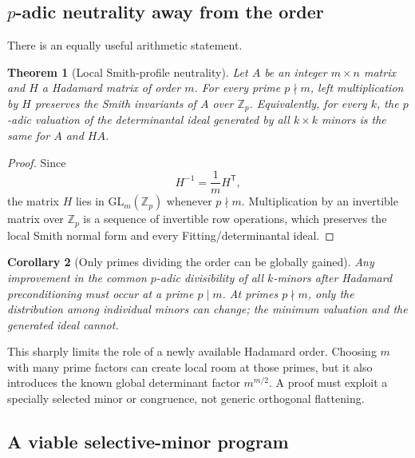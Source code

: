 \documentclass[11pt,oneside]{article}
\newtheorem{theorem}{Theorem}[section]
\newtheorem{corollary}[theorem]{Corollary}
\theoremstyle{definition}
\theoremstyle{remark}
\newcommand{\Z}{\mathbb Z}
\begin{document}
\subsection{$p$-adic neutrality away from the order}

There is an equally useful arithmetic statement.

\begin{theorem}[Local Smith-profile neutrality]
\label{thm:hadamard-smith}
Let $A$ be an integer $m\times n$ matrix and $H$ a Hadamard matrix of order $m$.  For every
prime $p\nmid m$, left multiplication by $H$ preserves the Smith invariants of $A$ over
$\Z_p$.  Equivalently, for every $k$, the $p$-adic valuation of the determinantal ideal
generated by all $k\times k$ minors is the same for $A$ and $HA$.
\end{theorem}

\begin{proof}
Since
\[
 H^{-1}=\frac1m H^{\mathsf T},
\]
the matrix $H$ lies in $\mathrm{GL}_m(\Z_p)$ whenever $p\nmid m$.  Multiplication by an
invertible matrix over $\Z_p$ is a sequence of invertible row operations, which preserves
the local Smith normal form and every Fitting/determinantal ideal.
\end{proof}

\begin{corollary}[Only primes dividing the order can be globally gained]
Any improvement in the common $p$-adic divisibility of all $k$-minors after Hadamard
preconditioning must occur at a prime $p\mid m$.  At primes $p\nmid m$, only the distribution
among individual minors can change; the minimum valuation and the generated ideal cannot.
\end{corollary}

This sharply limits the role of a newly available Hadamard order.  Choosing $m$ with many
prime factors can create local room at those primes, but it also introduces the known global
determinant factor $m^{m/2}$.  A proof must exploit a specially selected minor or congruence,
not generic orthogonal flattening.

\subsection{A viable selective-minor program}
\end{document}
